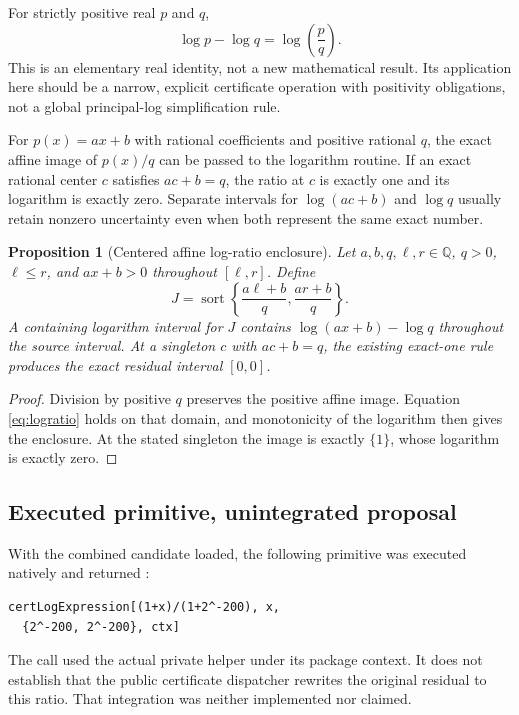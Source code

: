 \documentclass[11pt,letterpaper]{article}
\newcommand{\code}[1]{\texttt{\detokenize{#1}}}
\newcommand{\Q}{\mathbb Q}
\newtheorem{proposition}{Proposition}[section]
\theoremstyle{remark}\newtheorem{remark}[proposition]{Remark}
\begin{document}
For strictly positive real $p$ and $q$,
\begin{equation}\label{eq:logratio}
 \log p-\log q=\log\left(\frac pq\right).
\end{equation}
This is an elementary real identity, not a new mathematical result. Its
application here should be a narrow, explicit certificate operation with
positivity obligations, not a global principal-log simplification rule.

For $p(x)=ax+b$ with rational coefficients and positive rational $q$, the
exact affine image of $p(x)/q$ can be passed to the logarithm routine. If an
exact rational center $c$ satisfies $ac+b=q$, the ratio at $c$ is exactly
one and its logarithm is exactly zero. Separate intervals for
$\log(ac+b)$ and $\log q$ usually retain nonzero uncertainty even when both
represent the same exact number.

\begin{proposition}[Centered affine log-ratio enclosure]
Let $a,b,q,\ell,r\in\Q$, $q>0$, $\ell\le r$, and
$ax+b>0$ throughout $[\ell,r]$. Define
\[
 J=\operatorname{sort}\left\{\frac{a\ell+b}{q},
                             \frac{ar+b}{q}\right\}.
\]
A containing logarithm interval for $J$ contains
$\log(ax+b)-\log q$ throughout the source interval. At a singleton $c$ with
$ac+b=q$, the existing exact-one rule produces the exact residual interval
$[0,0]$.
\end{proposition}
\begin{proof}
Division by positive $q$ preserves the positive affine image. Equation
\eqref{eq:logratio} holds on that domain, and monotonicity of the logarithm
then gives the enclosure. At the stated singleton the image is exactly
$\{1\}$, whose logarithm is exactly zero.
\end{proof}

\subsection{Executed primitive, unintegrated proposal}
With the combined candidate loaded, the following primitive was executed
natively and returned \code{{0,0}}:
\begin{lstlisting}
certLogExpression[(1+x)/(1+2^-200), x,
  {2^-200, 2^-200}, ctx]
\end{lstlisting}
The call used the actual private helper under its package context. It does
not establish that the public certificate dispatcher rewrites the original
residual to this ratio. That integration was neither implemented nor claimed.
\end{document}
